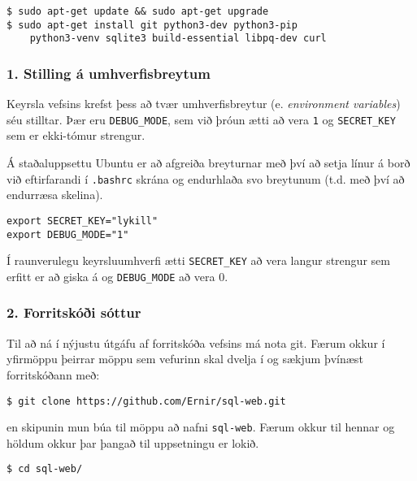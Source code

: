 \begin{verbatim}
$ sudo apt-get update && sudo apt-get upgrade
$ sudo apt-get install git python3-dev python3-pip 
    python3-venv sqlite3 build-essential libpq-dev curl
\end{verbatim}

\subsubsection{1. Stilling á
umhverfisbreytum}\label{stilling-uxe1-umhverfisbreytum}

Keyrsla vefsins krefst þess að tvær umhverfisbreytur (e.
\emph{environment variables}) séu stilltar. Þær eru
\texttt{DEBUG\_MODE}, sem við þróun ætti að vera \texttt{1} og
\texttt{SECRET\_KEY} sem er ekki-tómur strengur.

Á staðaluppsettu Ubuntu er að afgreiða breyturnar með því að setja línur
á borð við eftirfarandi í \texttt{.bashrc} skrána og endurhlaða svo
breytunum (t.d. með því að endurræsa skelina).

\begin{verbatim}
export SECRET_KEY="lykill"
export DEBUG_MODE="1"
\end{verbatim}

Í raunverulegu keyrsluumhverfi ætti \texttt{SECRET\_KEY} að vera langur
strengur sem erfitt er að giska á og \texttt{DEBUG\_MODE} að vera 0.

\subsubsection{2. Forritskóði sóttur}\label{forritskuxf3uxf0i-suxf3ttur}

Til að ná í nýjustu útgáfu af forritskóða vefsins má nota git. Færum
okkur í yfirmöppu þeirrar möppu sem vefurinn skal dvelja í og sækjum
þvínæst forritskóðann með:

\begin{verbatim}
$ git clone https://github.com/Ernir/sql-web.git
\end{verbatim}

en skipunin mun búa til möppu að nafni \texttt{sql-web}. Færum okkur til
hennar og höldum okkur þar þangað til uppsetningu er lokið.

\begin{verbatim}
$ cd sql-web/
\end{verbatim}

